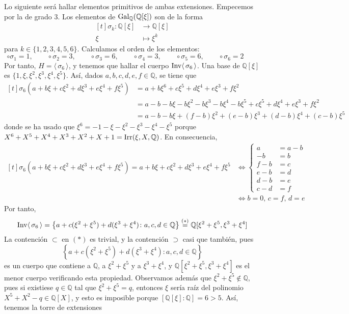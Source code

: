 \documentclass[11pt]{report}
\makeatletter
\renewenvironment{proof}[1][\proofname]{\par
  \pushQED{\qed}%
  \normalfont \topsep\z@skip %
  \trivlist
  \item[\hskip\labelsep
        \itshape
    #1\@addpunct{.}]\ignorespaces
}{%
  \popQED\endtrivlist\@endpefalse
}
\newcommand{\Q}{\mathbb Q}
\makeatother
\begin{document}
\begin{proof}
Lo siguiente será hallar elementos primitivos de ambas extensiones. Empecemos por la de grado $3$. Los elementos de $\textup{Gal}_\Q(\Q[\xi])$ son de la forma
\[\begin{aligned}[t]
    \sigma_k \colon \Q[\xi] &\longrightarrow \Q[\xi] \\
    \xi &\longmapsto \xi^k
\end{aligned}\]
para $k \in \{1,2,3,4,5,6\}$. Calculamos el orden de los elementos:
\[\circ \sigma_1 = 1, \qquad \circ \sigma_2 = 3, \qquad \circ \sigma_3 = 6, \qquad \circ \sigma_4 = 3, \qquad \circ \sigma_5 = 6, \qquad \circ \sigma_6 = 2 \qquad \]
Por tanto, $H = \langle \, \sigma_6\, \rangle$, y tenemos que hallar el cuerpo $\textup{Inv}\langle \, \sigma_6 \, \rangle$. Una base de $\Q[\xi]$ es $\{1,\xi,\xi^2,\xi^3,\xi^4,\xi^5\}$. Así, dados $a,b,c,d,e,f \in \Q$, se tiene que
\[\begin{aligned}[t]
    \sigma_6(a+b\xi+c\xi^2+d\xi^3+e\xi^4+f\xi^5) &= a+b\xi^6+c\xi^5+d\xi^4+e\xi^3+f\xi^2 \\
    &= a-b-b\xi-b\xi^2-b\xi^3-b\xi^4-b\xi^5+c\xi^5+d\xi^4+e\xi^3+f\xi^2 \\
    &= a-b-b\xi+(f-b)\xi^2+(e-b)\xi^3+(d-b)\xi^4+(c-b)\xi^5
\end{aligned}\]
donde se ha usado que $\xi^6=-1-\xi-\xi^2-\xi^3-\xi^4-\xi^5$ porque $X^6+X^5+X^4+X^3+X^2+X+1=\textup{Irr}(\xi,X,\Q)$. En consecuencia,
\[\begin{aligned}[t]
    \sigma_6(a+b\xi+c\xi^2+d\xi^3+e\xi^4+f\xi^5) =a+b\xi+c\xi^2+d\xi^3+e\xi^4+f\xi^5 &\iff \left\{\begin{alignedat}{1}
        a&=a-b \\
        -b&=b \\
        f-b&=c \\
        e-b&=d \\
        d-b&=e \\
        c-d&=f
        \end{alignedat}\right. \\[5pt]
    &\iff b=0, \, c = f, \, d = e
\end{aligned}\]
Por tanto,
\[\textup{Inv}\langle \, \sigma_6 \, \rangle = \left\{a+c(\xi^2+\xi^5)+d(\xi^3+\xi^4) \colon a,c,d\in \Q \right\} \overset{(*)}{=} \Q[\xi^2+\xi^5, \xi^3+\xi^4]\]
La contención $\subset$ en $(*)$ es trivial, y la contención $\supset$ casi que también, pues \[\left\{a+c(\xi^2+\xi^5)+d(\xi^3+\xi^4) \colon a,c,d\in \Q \right\}\] es un cuerpo que contiene a $\Q$, a $\xi^2+\xi^5$ y a $\xi^3+\xi^4$, y $\Q[\xi^2+\xi^5,\xi^3+\xi^4]$ es el menor cuerpo verificando esta propiedad. Observamos además que $\xi^2+\xi^5 \not\in \Q$, pues si existiese $q \in \Q$ tal que $\xi^2+\xi^5 = q$, entonces $\xi$ sería raíz del polinomio $X^5+X^2-q \in \Q[X]$, y esto es imposible porque $[\Q[\xi] \colon \Q] = 6 > 5$. Así, tenemos la torre de extensiones

\end{proof}
\end{document}
